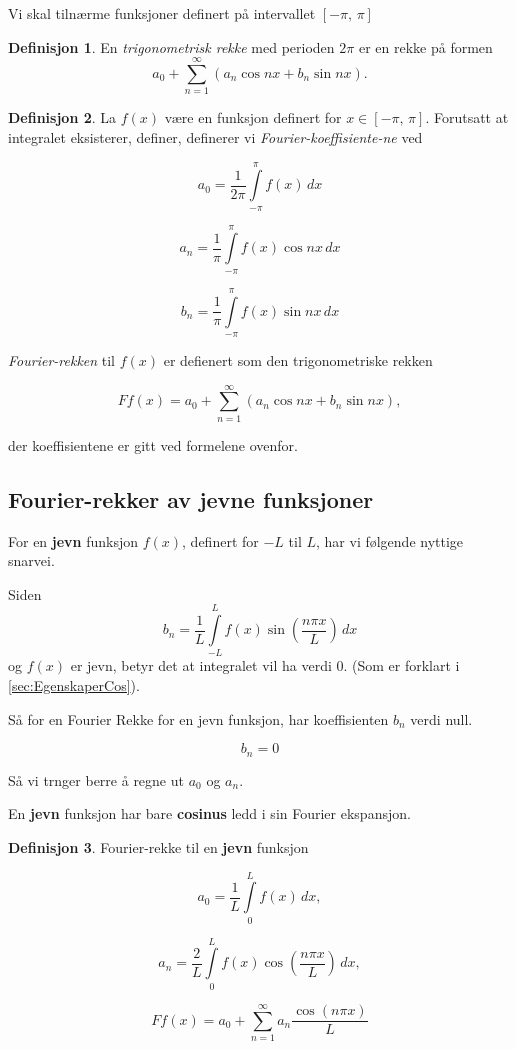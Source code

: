 \documentclass[11pt]{article}
\theoremstyle{definition}
\newtheorem{mindef}{Definisjon}[section]
\newenvironment{fmindef}
{\begin{mdframed}[style=minstil]\begin{mindef}}
		{\end{mindef}\end{mdframed}}
\theoremstyle{definition}
\theoremstyle{definition}
\theoremstyle{definition}
\theoremstyle{definition}
\theoremstyle{definition}
\begin{document}
		Vi skal tilnærme funksjoner definert på intervallet \([-\pi , \, \pi] \)
		
		\begin{fmindef}
			En \textit{trigonometrisk rekke } med perioden \(2\pi \) er en rekke på formen
			\[a_0+\sum_{n=1}^{\infty}(a_n\cos nx+b_n\sin nx). \]
		\end{fmindef}
		
		\begin{fmindef}
			La \(f(x)\) være en funksjon definert for \(x\in[-\pi,\,\pi]\). Forutsatt at integralet eksisterer, definer, definerer vi \textit{Fourier-koeffisiente-ne} ved
			
			\[a_0=\dfrac{1}{2\pi}\int\limits_{-\pi}^{\pi}  f(x)\,dx \] 
			
			\[a_n=\dfrac{1}{\pi}\int\limits_{-\pi}^{\pi}  f(x)\cos nx \,dx \]
			
			\[b_n=\dfrac{1}{\pi}\int\limits_{-\pi}^{\pi}  f(x)\sin nx \,dx \]
			
			\textit{Fourier-rekken} til \(f(x)\) er defienert som den trigonometriske rekken
			
			\[Ff(x)=a_0 + \sum_{n=1}^{\infty}(a_n\cos nx + b_n \sin nx),\]
			
			der koeffisientene er gitt ved formelene ovenfor.  
		\end{fmindef}
		
		\newpage
		
		\subsection{Fourier-rekker av jevne funksjoner}
		
		For en \textbf{jevn} funksjon \(f(x)\), definert for \(-L\) til \(L\), har vi følgende nyttige snarvei.
		
		Siden \[b_n=\dfrac{1}{L}\int\limits_{-L}^{L}f(x)\sin\left(\dfrac{n\pi x}{L} \right)\, dx   \]
		og \(f(x)\) er jevn, betyr det at integralet vil ha verdi 0. (Som er forklart i \ref{sec:EgenskaperCos}).
		
		Så for en Fourier Rekke for en jevn funksjon, har koeffisienten \(b_n\) verdi null.
		
		\[b_n=0\]
		
		
		Så vi trnger berre å regne ut \(a_0\) og \(a_n\).
		
		En \textbf{jevn} funksjon har bare \textbf{cosinus} ledd i sin Fourier ekspansjon.
		
		\begin{fmindef}
			Fourier-rekke til en \textbf{jevn} funksjon
			
			\[a_0=\dfrac{1}{L}\int\limits_{0}^{L} f(x) \, dx, \]
			
			\[a_n=\dfrac{2}{L}\int\limits_{0}^{L} f(x)\cos \left( \frac{n\pi x}{L} \right) \,dx, \]
			
			\[Ff(x)=a_0+\sum_{n=1}^{\infty}a_n\dfrac{\cos (n\pi x)}{L} \]
		\end{fmindef}
	   	
\end{document}
